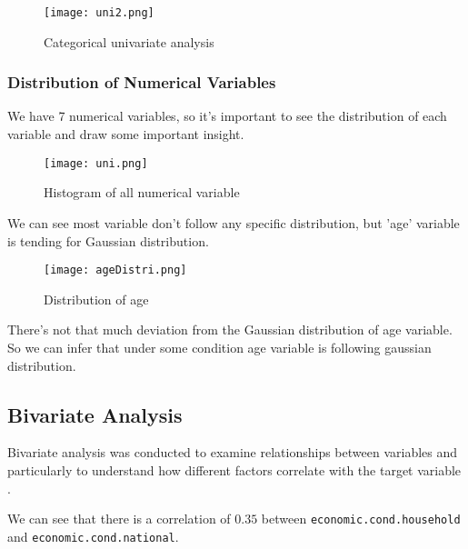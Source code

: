 \documentclass[12pt]{article}
\begin{document}
\begin{figure}[H]
    \centering
    \texttt{[image: uni2.png]}
    \caption{Categorical univariate analysis}
    \label{fig:example}
\end{figure}



\subsubsection{Distribution of Numerical Variables}

We have 7 numerical variables, so it's important to see the distribution of each variable and draw some important insight.
\begin{figure}[H]
    \centering
    \texttt{[image: uni.png]}
    \caption{Histogram of all numerical variable}
    \label{fig:example}
\end{figure}

We can see most variable don't follow any specific distribution, but 'age' variable is tending for Gaussian distribution.

\begin{figure}[H]
    \centering
    \texttt{[image: ageDistri.png]}
    \caption{Distribution of age}
    \label{fig:example}
\end{figure}

There's not that much deviation from the Gaussian distribution of age variable. So we can infer that under some condition age variable is following gaussian distribution.





\subsection{Bivariate Analysis}

Bivariate analysis was conducted to examine relationships between variables and particularly to understand how different factors correlate with the target variable .

We can see that there is a correlation of $0.35$ between \texttt{economic.cond.household} and \texttt{economic.cond.national}. 
\end{document}
